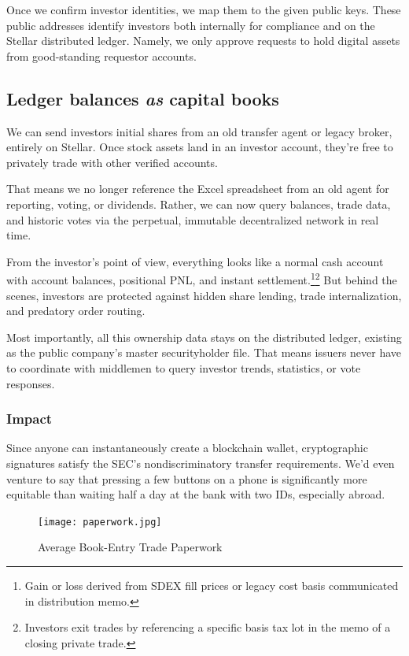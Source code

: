 \documentclass[11pt, english]{article}
\begin{document}
\begin{multicols}{2}
Once we confirm investor identities, we map them to the given public keys. These public addresses identify investors both internally for compliance and on the Stellar distributed ledger. Namely, we only approve requests to hold digital assets from good-standing requestor accounts.


\subsection{Ledger balances \textit{as} capital books}

We can send investors initial shares from an old transfer agent or legacy broker, entirely on Stellar. Once stock assets land in an investor account, they're free to privately trade with other verified accounts.

That means we no longer reference the Excel spreadsheet from an old agent for reporting, voting, or dividends. Rather, we can now query balances, trade data, and historic votes via the perpetual, immutable decentralized network in real time.

From the investor's point of view, everything looks like a normal cash account with account balances, positional PNL, and instant settlement.\footnote{Gain or loss derived from SDEX fill prices or legacy cost basis communicated in distribution memo.}\footnote{Investors exit trades by referencing a specific basis tax lot in the memo of a closing private trade.} But behind the scenes, investors are protected against hidden share lending, trade internalization, and predatory order routing.

Most importantly, all this ownership data stays on the distributed ledger, existing as the public company's master securityholder file. That means issuers never have to coordinate with middlemen to query investor trends, statistics, or vote responses.

\subsubsection{Impact}

Since anyone can instantaneously create a blockchain wallet, cryptographic signatures satisfy the SEC's nondiscriminatory transfer requirements. We'd even venture to say that pressing a few buttons on a phone is significantly more equitable than waiting half a day at the bank with two IDs, especially abroad.

\begin{figure}[H]
    \centering
    \texttt{[image: paperwork.jpg]}
    \caption{Average Book-Entry Trade Paperwork}
\end{figure}


\end{multicols}
\end{document}
